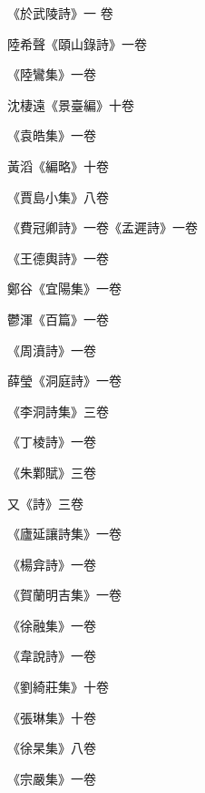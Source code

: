 \begin{pinyinscope}
 《於武陵詩》一
 卷



 陸希聲《頤山錄詩》一卷



 《陸鸞集》一卷



 沈棲遠《景臺編》十卷



 《袁皓集》一卷



 黃滔《編略》十卷



 《賈島小集》八卷



 《費冠卿詩》一卷《孟遲詩》一卷



 《王德輿詩》一卷



 鄭谷《宜陽集》一卷



 鬱渾《百篇》一卷



 《周濆詩》一卷



 薛瑩《洞庭詩》一卷



 《李洞詩集》三卷



 《丁棱詩》一卷



 《朱鄴賦》三卷



 又《詩》三卷



 《廬延讓詩集》一卷



 《楊弇詩》一卷



 《賀蘭明吉集》一卷



 《徐融集》一卷



 《韋說詩》一卷



 《劉綺莊集》十卷



 《張琳集》十卷



 《徐杲集》八卷



 《宗嚴集》一卷




\end{pinyinscope}
